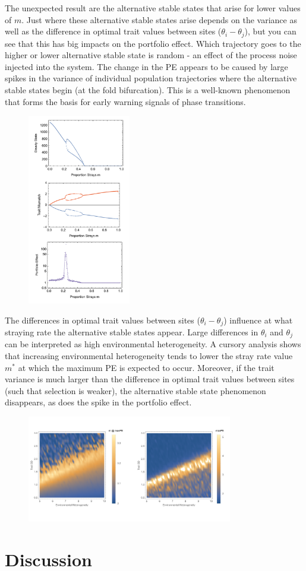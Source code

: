 \documentclass[onecolumn,preprintnumbers,amsmath,amssymb,superscriptaddress]{revtex4}
\begin{document}
The unexpected result are the alternative stable states that arise for lower values of $m$. Just where these alternative stable states arise depends on the variance as well as the difference in optimal trait values between sites ($\theta_i-\theta_j$), but you can see that this has big impacts on the portfolio effect.
Which trajectory goes to the higher or lower alternative stable state is random - an effect of the process noise injected into the system.
The change in the PE appears to be caused by large spikes in the variance of individual population trajectories where the alternative stable states begin (at the fold bifurcation).
This is a well-known phenomenon that forms the basis for early warning signals of phase transitions.

\begin{figure}[h]
\centering
\includegraphics[width=0.4\textwidth]{figs/fig_Density.pdf}
\caption{}
\end{figure}


The differences in optimal trait values between sites ($\theta_i-\theta_j$) influence at what straying rate the alternative stable states appear.
Large differences in $\theta_i$ and $\theta_j$ can be interpreted as high environmental heterogeneity.
A cursory analysis shows that increasing environmental heterogeneity tends to lower the stray rate value $m^*$ at which the maximum PE is expected to occur.
Moreover, if the trait variance is much larger than the difference in optimal trait values between sites (such that selection is weaker), the alternative stable state phenomenon disappears, as does the spike in the portfolio effect.


\begin{figure}[h]
\centering
\includegraphics[width=0.8\textwidth]{figs/fig_HSDcomb.png}
\caption{}
\end{figure}


\section*{Discussion}
\end{document}
